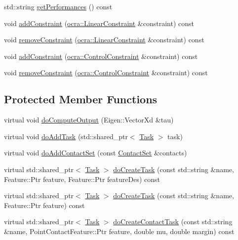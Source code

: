 \begin{DoxyCompactItemize}
\item 
std\+::string \hyperlink{classwocra_1_1WocraController_a44695f9e97a941d0c33da1872030566a}{get\+Performances} () const 
\item 
void \hyperlink{classwocra_1_1WocraController_ad52998ef1b3eb30e62697027e3b98945}{add\+Constraint} (\hyperlink{namespaceocra_ae8b87cf4099be3efc3b410019ad2046e}{ocra\+::\+Linear\+Constraint} \&constraint) const 
\item 
void \hyperlink{classwocra_1_1WocraController_ac2cfe82f7fa0a8438160376094f583da}{remove\+Constraint} (\hyperlink{namespaceocra_ae8b87cf4099be3efc3b410019ad2046e}{ocra\+::\+Linear\+Constraint} \&constraint) const 
\item 
void \hyperlink{classwocra_1_1WocraController_a792ca8a7b81817ebefd5c6fcab6e5eee}{add\+Constraint} (\hyperlink{classocra_1_1ControlConstraint}{ocra\+::\+Control\+Constraint} \&constraint) const 
\item 
void \hyperlink{classwocra_1_1WocraController_a4690b2bb73e8c7868d1b8a02378316e8}{remove\+Constraint} (\hyperlink{classocra_1_1ControlConstraint}{ocra\+::\+Control\+Constraint} \&constraint) const 
\end{DoxyCompactItemize}
\subsection*{Protected Member Functions}
\begin{DoxyCompactItemize}
\item 
virtual void \hyperlink{classwocra_1_1WocraController_aaf750c45d062220e3f78ccb1c8a41d07}{do\+Compute\+Output} (Eigen\+::\+Vector\+Xd \&tau)
\item 
virtual void \hyperlink{classwocra_1_1WocraController_aa9a681aa5c0f043638d4d2956c2913c1}{do\+Add\+Task} (std\+::shared\+\_\+ptr$<$ \hyperlink{classocra_1_1Task}{Task} $>$ task)
\item 
virtual void \hyperlink{classwocra_1_1WocraController_a74d8fa3103ca3787add351620c5bcf73}{do\+Add\+Contact\+Set} (const \hyperlink{classocra_1_1ContactSet}{Contact\+Set} \&contacts)
\item 
virtual std\+::shared\+\_\+ptr$<$ \hyperlink{classocra_1_1Task}{Task} $>$ \hyperlink{classwocra_1_1WocraController_a5c262993b8c418aa61ccfac921891416}{do\+Create\+Task} (const std\+::string \&name, Feature\+::\+Ptr feature, Feature\+::\+Ptr feature\+Des) const 
\item 
virtual std\+::shared\+\_\+ptr$<$ \hyperlink{classocra_1_1Task}{Task} $>$ \hyperlink{classwocra_1_1WocraController_aa04446cc76a0868e875597720bbc6449}{do\+Create\+Task} (const std\+::string \&name, Feature\+::\+Ptr feature) const 
\item 
virtual std\+::shared\+\_\+ptr$<$ \hyperlink{classocra_1_1Task}{Task} $>$ \hyperlink{classwocra_1_1WocraController_a3d64cc975fa9b62e5d9919f34ea7d847}{do\+Create\+Contact\+Task} (const std\+::string \&name, Point\+Contact\+Feature\+::\+Ptr feature, double mu, double margin) const 
\end{DoxyCompactItemize}
